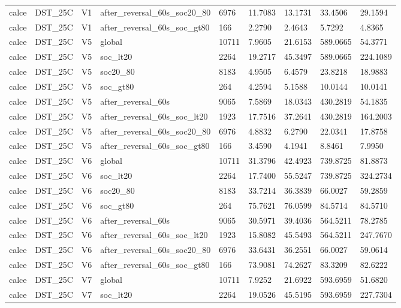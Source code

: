 \begin{tabular}{lllllllll}
calce & DST\_25C & V1 & after\_reversal\_60s\_soc20\_80 & 6976 & 11.7083 & 13.1731 & 33.4506 & 29.1594 \\
calce & DST\_25C & V1 & after\_reversal\_60s\_soc\_gt80 & 166 & 2.2790 & 2.4643 & 5.7292 & 4.8365 \\
calce & DST\_25C & V5 & global & 10711 & 7.9605 & 21.6153 & 589.0665 & 54.3771 \\
calce & DST\_25C & V5 & soc\_lt20 & 2264 & 19.2717 & 45.3497 & 589.0665 & 224.1089 \\
calce & DST\_25C & V5 & soc20\_80 & 8183 & 4.9505 & 6.4579 & 23.8218 & 18.9883 \\
calce & DST\_25C & V5 & soc\_gt80 & 264 & 4.2594 & 5.1588 & 10.0144 & 10.0141 \\
calce & DST\_25C & V5 & after\_reversal\_60s & 9065 & 7.5869 & 18.0343 & 430.2819 & 54.1835 \\
calce & DST\_25C & V5 & after\_reversal\_60s\_soc\_lt20 & 1923 & 17.7516 & 37.2641 & 430.2819 & 164.2003 \\
calce & DST\_25C & V5 & after\_reversal\_60s\_soc20\_80 & 6976 & 4.8832 & 6.2790 & 22.0341 & 17.8758 \\
calce & DST\_25C & V5 & after\_reversal\_60s\_soc\_gt80 & 166 & 3.4590 & 4.1941 & 8.8461 & 7.9950 \\
calce & DST\_25C & V6 & global & 10711 & 31.3796 & 42.4923 & 739.8725 & 81.8873 \\
calce & DST\_25C & V6 & soc\_lt20 & 2264 & 17.7400 & 55.5247 & 739.8725 & 324.2734 \\
calce & DST\_25C & V6 & soc20\_80 & 8183 & 33.7214 & 36.3839 & 66.0027 & 59.2859 \\
calce & DST\_25C & V6 & soc\_gt80 & 264 & 75.7621 & 76.0599 & 84.5714 & 84.5710 \\
calce & DST\_25C & V6 & after\_reversal\_60s & 9065 & 30.5971 & 39.4036 & 564.5211 & 78.2785 \\
calce & DST\_25C & V6 & after\_reversal\_60s\_soc\_lt20 & 1923 & 15.8082 & 45.5493 & 564.5211 & 247.7670 \\
calce & DST\_25C & V6 & after\_reversal\_60s\_soc20\_80 & 6976 & 33.6431 & 36.2551 & 66.0027 & 59.0614 \\
calce & DST\_25C & V6 & after\_reversal\_60s\_soc\_gt80 & 166 & 73.9081 & 74.2627 & 83.3209 & 82.6222 \\
calce & DST\_25C & V7 & global & 10711 & 7.9252 & 21.6922 & 593.6959 & 51.6820 \\
calce & DST\_25C & V7 & soc\_lt20 & 2264 & 19.0526 & 45.5195 & 593.6959 & 227.7304 \\

\end{tabular}
